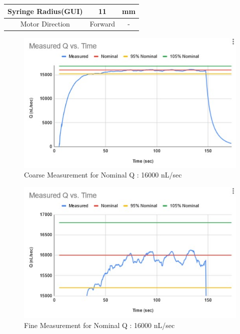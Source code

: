 \documentclass[journal]{IEEEtran}
\begin{document}
\begin{table}[H]
\begin{center}
\begin{tabular}{|c|c|c|}
                            
                            
                            Syringe Radius(GUI)&
                            11&
                            mm
                            \\ \hline
                            
                            Motor Direction&
                            Forward&
                            -
                            \\ \hline
                            
                        \end{tabular}
                    \end{center}
                \end{table}
                
                
                \begin{figure}[H]
                    \centering
                    \includegraphics[scale = 0.65]{Images/T2_coarse.jpg}
                    \caption{Coarse Measurement for Nominal Q : 16000 nL/sec}
                    \label{fig:T2_coarse}
                \end{figure}
                
                \begin{figure}[H]
                    \centering
                    \includegraphics[scale = 0.65]{Images/T2_fine.jpg}
                    \caption{Fine Measurement for Nominal Q : 16000 nL/sec}
                    \label{fig:T2_fine}
                \end{figure}
                
\end{document}
